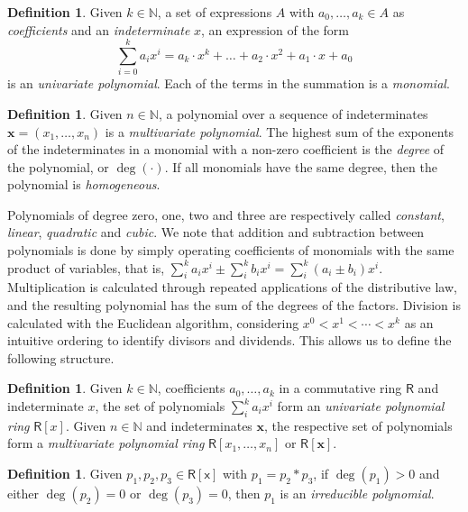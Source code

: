 \documentclass[draft, 12pt, a4paper, oneside]{memoir}
\theoremstyle{definition}
\newtheorem{definition}[theorem]{Definition}
\begin{document}
\begin{definition}
  Given $k \in \mathbb{N}$, a set of expressions $A$ with $a_{0}, \dots, a_{k} \in A$ as \emph{coefficients} and an \emph{indeterminate} $x$, an expression of the form
  \[
    \sum_{i = 0}^{k} a_{i} x^{i} 
      = a_{k} \cdot x^{k} + \dots + a_{2} \cdot x^{2} + a_{1} \cdot x + a_{0}
  \]
  is an \emph{univariate polynomial}. Each of the terms in the summation is a \emph{monomial}.
\end{definition}

\begin{definition}
  Given $n \in \mathbb{N}$, a polynomial over a sequence of indeterminates $\mathbf{x} = (x_{1}, \dots, x_{n})$ is a \emph{multivariate polynomial}. The highest sum of the exponents of the indeterminates in a monomial with a non-zero coefficient is the \emph{degree} of the polynomial, or $\deg(\cdot)$. If all monomials have the same degree, then the polynomial is \emph{homogeneous}.
\end{definition}

Polynomials of degree zero, one, two and three are respectively called \emph{constant}, \emph{linear}, \emph{quadratic} and \emph{cubic}. We note that addition and subtraction between polynomials is done by simply operating coefficients of monomials with the same product of variables, that is, $\sum_{i}^{k} a_{i} x^{i} \pm \sum_{i}^{k} b_{i} x^{i} = \sum_{i}^{k} (a_{i} \pm b_{i}) x^{i}$. Multiplication is calculated through repeated applications of the distributive law, and the resulting polynomial has the sum of the degrees of the factors. Division is calculated with the Euclidean algorithm, considering $x^{0} < x^{1} < \cdots < x^{k}$ as an intuitive ordering to identify divisors and dividends. This allows us to define the following structure.

\begin{definition}
  Given $k \in \mathbb{N}$, coefficients $a_{0}, \dots, a_{k}$ in a commutative ring $\mathsf{R}$ and indeterminate $x$, the set of polynomials $\sum_{i}^{k} a_{i} x^{i}$ form an \emph{univariate polynomial ring} $\mathsf{R}[x]$. Given $n \in \mathbb{N}$ and indeterminates $\mathbf{x}$, the respective set of polynomials form a \emph{multivariate polynomial ring} $\mathsf{R}[x_{1}, \dots, x_{n}]$ or $\mathsf{R}[\mathbf{x}]$.
\end{definition}

\begin{definition}
  Given $p_{1}, p_{2}, p_{3} \in \mathsf{R}[\mathsf{x}]$ with $p_{1} = p_{2} \ast p_{3}$, if $\deg(p_{1}) > 0$ and either $\deg(p_{2}) = 0$ or $\deg(p_{3}) = 0$, then $p_{1}$ is an \emph{irreducible polynomial}.
\end{definition}
\end{document}
